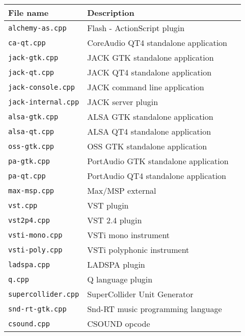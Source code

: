 \begin{table}[htp]
\begin{center}
\begin{tabular}{|l|l|l|}
\hline
\textbf{File name}			& \textbf{Description}   \\
\hline
\texttt{alchemy-as.cpp} 	& Flash - ActionScript plugin \\
\texttt{ca-qt.cpp} 			& CoreAudio QT4 standalone application  \\
\texttt{jack-gtk.cpp} 		& JACK GTK standalone application  \\
\texttt{jack-qt.cpp} 		& JACK QT4 standalone application  \\
\texttt{jack-console.cpp} 	& JACK command line application  \\
\texttt{jack-internal.cpp} 	& JACK server plugin  \\
\texttt{alsa-gtk.cpp} 		& ALSA GTK standalone application  \\
\texttt{alsa-qt.cpp} 		& ALSA QT4 standalone application  \\
\texttt{oss-gtk.cpp} 		& OSS GTK standalone application  \\
\texttt{pa-gtk.cpp} 		& PortAudio GTK standalone application  \\
\texttt{pa-qt.cpp} 		& PortAudio QT4 standalone application  \\
\hline
\texttt{max-msp.cpp} 	& Max/MSP external  \\
\texttt{vst.cpp} 			& VST plugin  \\
\texttt{vst2p4.cpp} 		& VST 2.4 plugin  \\
\texttt{vsti-mono.cpp} 	& VSTi mono instrument  \\
\texttt{vsti-poly.cpp} 		& VSTi polyphonic instrument  \\
\texttt{ladspa.cpp} 		& LADSPA plugin  \\
\texttt{q.cpp} 			& Q language plugin  \\
\texttt{supercollider.cpp} 	& SuperCollider Unit Generator  \\
\texttt{snd-rt-gtk.cpp} 	& Snd-RT music programming language  \\
\texttt{csound.cpp} 		& CSOUND opcode  \\

\end{tabular}
\end{center}
\end{table}
